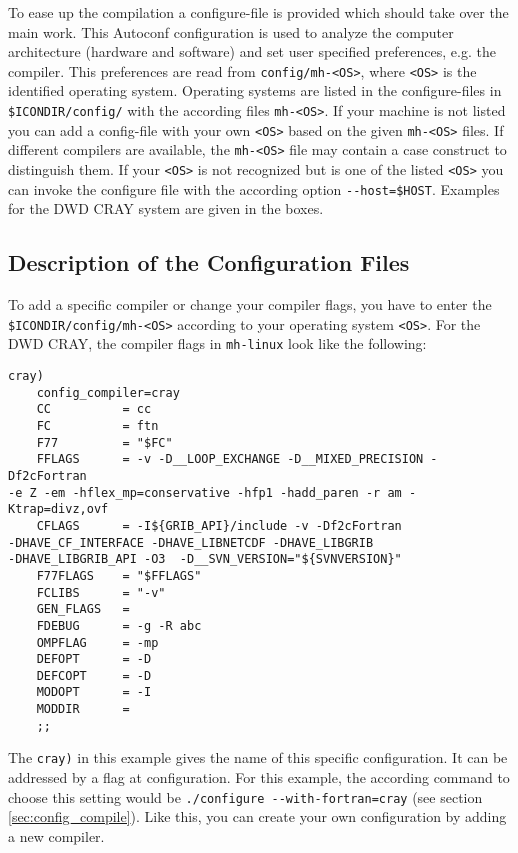 To ease up the compilation a configure-file is provided which should take over the main work. This Autoconf configuration is used to analyze the computer architecture (hardware and software) and set user specified preferences, e.g. the compiler. This preferences are read from \verb+config/mh-<OS>+, where \verb+<OS>+ is the identified operating system. Operating systems are listed in the configure-files in \verb+$ICONDIR/config/+ with the according files \verb+mh-<OS>+. If your machine is not listed you can add a config-file with your own \verb+<OS>+ based on the given \verb+mh-<OS>+ files. If different compilers are available, the \verb+mh-<OS>+ file may contain a case construct to distinguish them. If your \verb+<OS>+ is not recognized but is one of the listed \verb+<OS>+ you can invoke the configure file with the according option \verb+--host=$HOST+. Examples for the DWD CRAY system are given in the boxes.

\subsection{Description of the Configuration Files}

To add a specific compiler or change your compiler flags, you have to enter the \newline \verb+$ICONDIR/config/mh-<OS>+ according to your operating system \verb+<OS>+. For the DWD CRAY, the compiler flags in \verb+mh-linux+ look like the following:

\begin{Verbatim}[frame=single]
cray)
    config_compiler=cray
	CC          = cc
    FC          = ftn
    F77         = "$FC"
    FFLAGS      = -v -D__LOOP_EXCHANGE -D__MIXED_PRECISION -Df2cFortran 
-e Z -em -hflex_mp=conservative -hfp1 -hadd_paren -r am -Ktrap=divz,ovf
    CFLAGS      = -I${GRIB_API}/include -v -Df2cFortran 
-DHAVE_CF_INTERFACE -DHAVE_LIBNETCDF -DHAVE_LIBGRIB 
-DHAVE_LIBGRIB_API -O3  -D__SVN_VERSION="${SVNVERSION}"
    F77FLAGS    = "$FFLAGS"
    FCLIBS      = "-v"
    GEN_FLAGS   =
    FDEBUG      = -g -R abc
    OMPFLAG     = -mp
    DEFOPT      = -D
    DEFCOPT     = -D
    MODOPT      = -I
    MODDIR      = 
    ;;
\end{Verbatim}

The \verb+cray)+ in this example gives the name of this specific configuration. It can be addressed by a flag at configuration. For this example, the according command to choose this setting would be \verb+./configure --with-fortran=cray+ (see section \ref{sec:config_compile}). Like this, you can create your own configuration by adding a new compiler.

